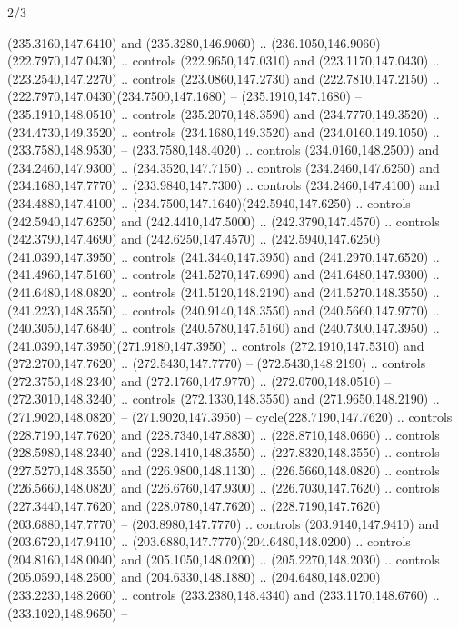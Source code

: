 \begin{flagdescription}{2/3}
\begin{scope}[xshift=0.5\flaglength,yshift=0.5\flagwidth,scale=\flagwidth/259.2]
\begin{scope}[y=0.8pt, x=0.8pt, yscale=-1,shift={(-243,-162)}]
      (235.3160,147.6410) and (235.3280,146.9060) ..
      (236.1050,146.9060)(222.7970,147.0430) .. controls (222.9650,147.0310) and
      (223.1170,147.0430) .. (223.2540,147.2270) .. controls (223.0860,147.2730) and
      (222.7810,147.2150) .. (222.7970,147.0430)(234.7500,147.1680) --
      (235.1910,147.1680) -- (235.1910,148.0510) .. controls (235.2070,148.3590) and
      (234.7770,149.3520) .. (234.4730,149.3520) .. controls (234.1680,149.3520) and
      (234.0160,149.1050) .. (233.7580,148.9530) -- (233.7580,148.4020) .. controls
      (234.0160,148.2500) and (234.2460,147.9300) .. (234.3520,147.7150) .. controls
      (234.2460,147.6250) and (234.1680,147.7770) .. (233.9840,147.7300) .. controls
      (234.2460,147.4100) and (234.4880,147.4100) ..
      (234.7500,147.1640)(242.5940,147.6250) .. controls (242.5940,147.6250) and
      (242.4410,147.5000) .. (242.3790,147.4570) .. controls (242.3790,147.4690) and
      (242.6250,147.4570) .. (242.5940,147.6250)(241.0390,147.3950) .. controls
      (241.3440,147.3950) and (241.2970,147.6520) .. (241.4960,147.5160) .. controls
      (241.5270,147.6990) and (241.6480,147.9300) .. (241.6480,148.0820) .. controls
      (241.5120,148.2190) and (241.5270,148.3550) .. (241.2230,148.3550) .. controls
      (240.9140,148.3550) and (240.5660,147.9770) .. (240.3050,147.6840) .. controls
      (240.5780,147.5160) and (240.7300,147.3950) ..
      (241.0390,147.3950)(271.9180,147.3950) .. controls (272.1910,147.5310) and
      (272.2700,147.7620) .. (272.5430,147.7770) -- (272.5430,148.2190) .. controls
      (272.3750,148.2340) and (272.1760,147.9770) .. (272.0700,148.0510) --
      (272.3010,148.3240) .. controls (272.1330,148.3550) and (271.9650,148.2190) ..
      (271.9020,148.0820) -- (271.9020,147.3950) -- cycle(228.7190,147.7620) ..
      controls (228.7190,147.7620) and (228.7340,147.8830) .. (228.8710,148.0660) ..
      controls (228.5980,148.2340) and (228.1410,148.3550) .. (227.8320,148.3550) ..
      controls (227.5270,148.3550) and (226.9800,148.1130) .. (226.5660,148.0820) ..
      controls (226.5660,148.0820) and (226.6760,147.9300) .. (226.7030,147.7620) ..
      controls (227.3440,147.7620) and (228.0780,147.7620) ..
      (228.7190,147.7620)(203.6880,147.7770) -- (203.8980,147.7770) .. controls
      (203.9140,147.9410) and (203.6720,147.9410) ..
      (203.6880,147.7770)(204.6480,148.0200) .. controls (204.8160,148.0040) and
      (205.1050,148.0200) .. (205.2270,148.2030) .. controls (205.0590,148.2500) and
      (204.6330,148.1880) .. (204.6480,148.0200)(233.2230,148.2660) .. controls
      (233.2380,148.4340) and (233.1170,148.6760) .. (233.1020,148.9650) --

\end{scope}
\end{scope}
\end{flagdescription}
